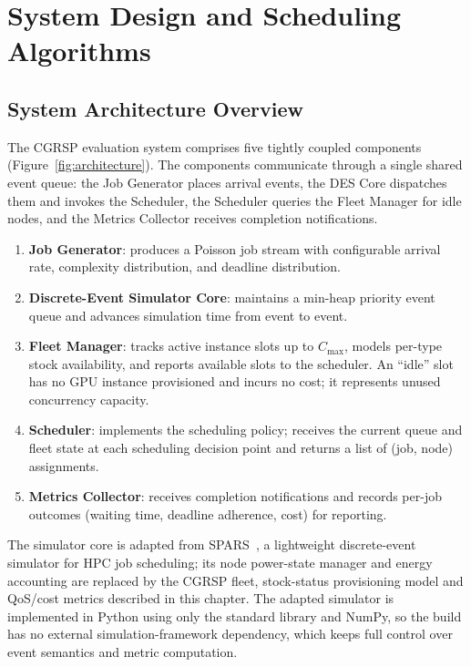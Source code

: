 \chapter{System Design and Scheduling Algorithms}
\label{chap:system}

\section{System Architecture Overview}
\label{sec:system-architecture-overview}

The CGRSP evaluation system comprises five tightly coupled components (Figure~\ref{fig:architecture}). The components communicate through a single shared event queue: the Job Generator places arrival events, the DES Core dispatches them and invokes the Scheduler, the Scheduler queries the Fleet Manager for idle nodes, and the Metrics Collector receives completion notifications.



\begin{enumerate}
  \item \textbf{Job Generator}: produces a Poisson job stream with configurable arrival rate, complexity distribution, and deadline distribution.
  \item \textbf{Discrete-Event Simulator Core}: maintains a min-heap priority event queue and advances simulation time from event to event.
  \item \textbf{Fleet Manager}: tracks active instance slots up to $C_{\max}$, models per-type stock availability, and reports available slots to the scheduler. An ``idle'' slot has no GPU instance provisioned and incurs no cost; it represents unused concurrency capacity.
  \item \textbf{Scheduler}: implements the scheduling policy; receives the current queue and fleet state at each scheduling decision point and returns a list of (job, node) assignments.
  \item \textbf{Metrics Collector}: receives completion notifications and records per-job outcomes (waiting time, deadline adherence, cost) for reporting.
\end{enumerate}

The simulator core is adapted from SPARS~\cite{amrizal2026spars}, a lightweight discrete-event simulator for HPC job scheduling; its node power-state manager and energy accounting are replaced by the CGRSP fleet, stock-status provisioning model and QoS/cost metrics described in this chapter. The adapted simulator is implemented in Python using only the standard library and NumPy, so the build has no external simulation-framework dependency, which keeps full control over event semantics and metric computation.


